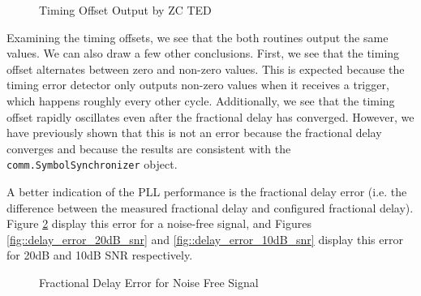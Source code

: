 \documentclass{article}
\begin{document}
\begin{figure}[H]
	\centerline{}
	\caption{Timing Offset Output by ZC TED}
	\label{fig::timing_offset}
\end{figure}

\noindent Examining the timing offsets, we see that the both routines output the same values. We can also draw a few other conclusions. First, we see that the timing offset alternates between zero and non-zero values. This is expected because the timing error detector only outputs non-zero values when it receives a trigger, which happens roughly every other cycle. Additionally, we see that the timing offset rapidly oscillates even after the fractional delay has converged. However, we have previously shown that this is not an error because the fractional delay converges and because the results are consistent with the \texttt{comm.SymbolSynchronizer} object.

A better indication of the PLL performance is the fractional delay error (i.e. the difference between the measured fractional delay and configured fractional delay). Figure \ref{fig::delay_error_no_noise} display this error for a noise-free signal, and Figures \ref{fig::delay_error_20dB_snr} and \ref{fig::delay_error_10dB_snr} display this error for 20dB and 10dB SNR respectively. 

\begin{figure}[H]
	\centerline{}
	\caption{Fractional Delay Error for Noise Free Signal}
	\label{fig::delay_error_no_noise}
\end{figure}
\end{document}
